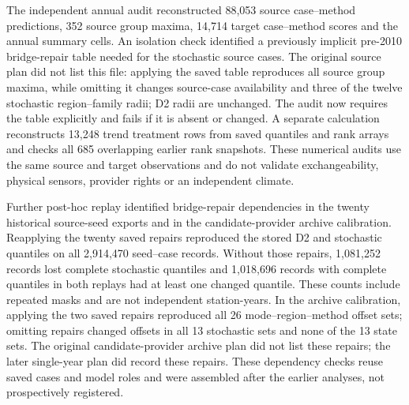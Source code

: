 The independent annual audit reconstructed 88,053 source case--method predictions, 352 source group maxima, 14,714 target case--method scores and the annual summary cells. An isolation check identified a previously implicit pre-2010 bridge-repair table needed for the stochastic source cases. The original source plan did not list this file: applying the saved table reproduces all source group maxima, while omitting it changes source-case availability and three of the twelve stochastic region--family radii; D2 radii are unchanged. The audit now requires the table explicitly and fails if it is absent or changed. A separate calculation reconstructs 13,248 trend treatment rows from saved quantiles and rank arrays and checks all 685 overlapping earlier rank snapshots. These numerical audits use the same source and target observations and do not validate exchangeability, physical sensors, provider rights or an independent climate.

Further post-hoc replay identified bridge-repair dependencies in the twenty historical source-seed exports and in the candidate-provider archive calibration. Reapplying the twenty saved repairs reproduced the stored D2 and stochastic quantiles on all 2,914,470 seed--case records. Without those repairs, 1,081,252 records lost complete stochastic quantiles and 1,018,696 records with complete quantiles in both replays had at least one changed quantile. These counts include repeated masks and are not independent station-years. In the archive calibration, applying the two saved repairs reproduced all 26 mode--region--method offset sets; omitting repairs changed offsets in all 13 stochastic sets and none of the 13 state sets. The original candidate-provider archive plan did not list these repairs; the later single-year plan did record these repairs. These dependency checks reuse saved cases and model roles and were assembled after the earlier analyses, not prospectively registered.
